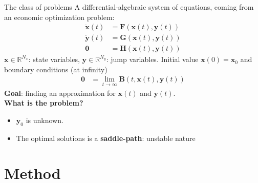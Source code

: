 \documentclass[aspectratio=169,10pt]{beamer}
\newcommand{\emphcolor}[1]{\textbf{\textcolor{emphcolorval}{#1}}}
\begin{document}
\begin{frame}{The class of problems}
A differential-algebraic system of equations, coming from an economic optimization problem:	
	\begin{align}
		\dot{\mathbf{x}}(t) &= \mathbf{F}(\mathbf{x}(t), \mathbf{y}(t))\\ %
		\dot{\mathbf{y}}(t) &= \mathbf{G}(\mathbf{x}(t), \mathbf{y}(t))\\
		\mathbf{0} &= \mathbf{H}(\mathbf{x}(t), \mathbf{y}(t))
	\end{align}
$\mathbf{x}\in \mathbb{R}^{N_x}$: state variables, $\mathbf{y}\in\mathbb{R}^{N_y}$: jump variables.
Initial value $\mathbf{x}(0) = \mathbf{x}_0$ and boundary conditions (at infinity)
	\begin{align}
		\mathbf{0} &= \lim_{t\rightarrow\infty} \mathbf{B}(t,\mathbf{x}(t), \mathbf{y}(t))
	\end{align}
\emphcolor{Goal}: finding an approximation for $\mathbf{x}(t)$ and $\mathbf{y}(t)$.\\
	\vspace{0.1in}
\emphcolor{What is the problem?} 
\begin{itemize}
	\item $\mathbf{y}_0$ is unknown. 
	\vspace{0.1in}
	\item The optimal solutions is a \emphcolor{saddle-path}: unstable nature
	\vspace{0.1in}
\end{itemize}
\end{frame}

\section{Method}
\end{document}
